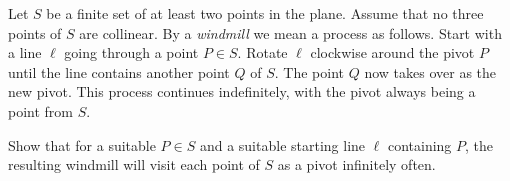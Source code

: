 Let $S$ be a finite set of at least two points in the plane. Assume that no three points of $S$ are collinear. By a \emph{windmill} we mean a process as follows. Start with a line $\ell$ going through a point $P \in S$. Rotate $\ell$ clockwise around the pivot $P$ until the line contains another point $Q$ of $S$. The point $Q$ now takes over as the new pivot. This process continues indefinitely, with the pivot always being a point from $S$.

Show that for a suitable $P \in S$ and a suitable starting line $\ell$ containing $P$, the resulting windmill will visit each point of $S$ as a pivot infinitely often.
